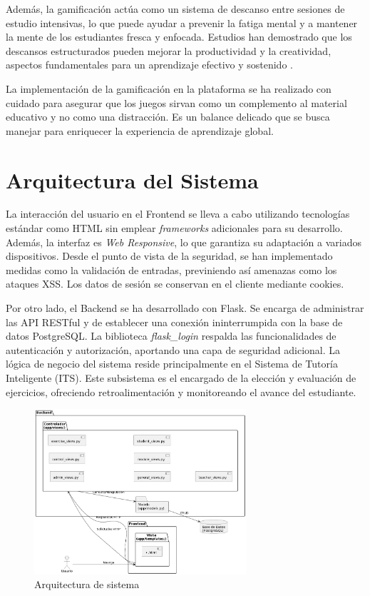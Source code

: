 Además, la gamificación actúa como un sistema de descanso entre sesiones de estudio intensivas, lo que puede ayudar a prevenir la fatiga mental y a mantener la mente de los estudiantes fresca y enfocada. Estudios han demostrado que los descansos estructurados pueden mejorar la productividad y la creatividad, aspectos fundamentales para un aprendizaje efectivo y sostenido \cite{ariga2011brief}.

La implementación de la gamificación en la plataforma se ha realizado con cuidado para asegurar que los juegos sirvan como un complemento al material educativo y no como una distracción. Es un balance delicado que se busca manejar para enriquecer la experiencia de aprendizaje global.

\section{Arquitectura del Sistema}

La interacción del usuario en el Frontend se lleva a cabo utilizando tecnologías estándar como HTML sin emplear \textit{frameworks} adicionales para su desarrollo. Además, la interfaz es \textit{Web Responsive}, lo que garantiza su adaptación a variados dispositivos. Desde el punto de vista de la seguridad, se han implementado medidas como la validación de entradas, previniendo así amenazas como los ataques XSS. Los datos de sesión se conservan en el cliente mediante cookies.

Por otro lado, el Backend se ha desarrollado con Flask. Se encarga de administrar las API RESTful y de establecer una conexión ininterrumpida con la base de datos PostgreSQL. La biblioteca \textit{flask\_login} respalda las funcionalidades de autenticación y autorización, aportando una capa de seguridad adicional. La lógica de negocio del sistema reside principalmente en el Sistema de Tutoría Inteligente (ITS). Este subsistema es el encargado de la elección y evaluación de ejercicios, ofreciendo retroalimentación y monitoreando el avance del estudiante.

\begin{figure}[H]
    \centering
    \includegraphics[width=0.7\textwidth]{imagenes/ArquitecturaDeSistema.jpeg}
    
    \caption{Arquitectura de sistema}
    \label{fig:arqsistema}
\end{figure}

